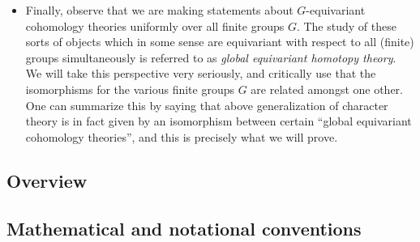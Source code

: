 \begin{itemize}[leftmargin=*]
\item Finally, observe that we are making statements about
  $G$-equivariant cohomology theories uniformly over all finite groups
  $G$. The study of these sorts of objects which in some sense are
  equivariant with respect to all (finite) groups simultaneously is
  referred to as \emph{global equivariant homotopy theory}. We will
  take this perspective very seriously, and critically use that the
  isomorphisms for the various finite groups $G$ are related amongst
  one other. One can summarize this by saying that above
  generalization of character theory is in fact given by an
  isomorphism between certain ``global equivariant cohomology
  theories'', and this is precisely what we will prove.
\end{itemize}


\subsection{Overview}
\label{intro-overview}

\usetikzlibrary{positioning}
\begin{center}
\end{center}


\subsection{Mathematical and notational conventions}
\label{intro-conventions}

